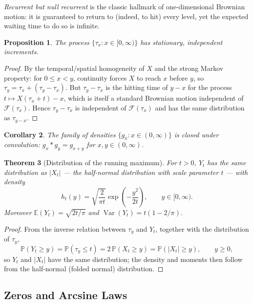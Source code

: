 \documentclass[12pt,openany]{book}
\newtheorem{theorem}{Theorem}[section]
\newtheorem{proposition}[theorem]{Proposition}
\newtheorem{corollary}[theorem]{Corollary}
\theoremstyle{definition}
\theoremstyle{remark}
\newcommand{\E}{\mathbb{E}}
\newcommand{\Prob}{\mathbb{P}}
\newcommand{\Fscr}{\mathcal{F}}
\DeclareMathOperator{\Var}{Var}
\begin{document}
\emph{Recurrent but null recurrent} is the classic hallmark of one-dimensional Brownian motion: it is guaranteed to return to (indeed, to hit) every level, yet the expected waiting time to do so is infinite.
 
\begin{proposition}
The process $\{\tau_x : x \in [0,\infty)\}$ has stationary, independent increments.
\end{proposition}
\begin{proof}
By the temporal/spatial homogeneity of $X$ and the strong Markov property: for $0 \le x<y$, continuity forces $X$ to reach $x$ before $y$, so $\tau_y = \tau_x + (\tau_y - \tau_x)$. But $\tau_y - \tau_x$ is the hitting time of $y-x$ for the process $t \mapsto X(\tau_x+t) - x$, which is itself a standard Brownian motion independent of $\Fscr(\tau_x)$. Hence $\tau_y - \tau_x$ is independent of $\Fscr(\tau_x)$ and has the same distribution as $\tau_{y-x}$.
\end{proof}
 
\begin{corollary}
The family of densities $\{g_x : x \in (0,\infty)\}$ is closed under convolution: $g_x * g_y = g_{x+y}$ for $x,y\in(0,\infty)$.
\end{corollary}
 
\begin{theorem}[Distribution of the running maximum]
For $t>0$, $Y_t$ has the same distribution as $|X_t|$ — the \emph{half-normal distribution} with scale parameter $t$ — with density
\begin{equation}
    h_t(y) = \sqrt{\frac{2}{\pi t}} \exp\!\left(-\frac{y^2}{2t}\right), \qquad y \in [0,\infty). \tag{18.1.27}
\end{equation}
Moreover $\E(Y_t) = \sqrt{2t/\pi}$ and $\Var(Y_t) = t(1-2/\pi)$.
\end{theorem}
\begin{proof}
From the inverse relation between $\tau_y$ and $Y_t$, together with the distribution of $\tau_y$,
\[
    \Prob(Y_t \ge y) = \Prob(\tau_y \le t) = 2\,\Prob(X_t\ge y) = \Prob(|X_t| \ge y), \qquad y \ge 0,
\]
so $Y_t$ and $|X_t|$ have the same distribution; the density and moments then follow from the half-normal (folded normal) distribution.
\end{proof}
 
\subsection{Zeros and Arcsine Laws}
 
\end{document}

